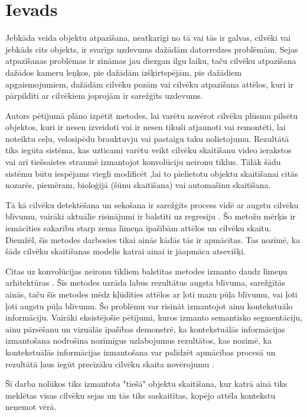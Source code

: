 \chapter{Ievads}
Jebkāda veida objektu atpazīšana, neatkarīgi no tā vai tās ir galvas, cilvēki vai jebkāds cits objekts, ir svarīgs uzdevums dažādām datorredzes problēmām. Sejas atpazīšanas problēmas ir zināmas jau diezgan ilgu laiku, taču cilvēku atpazīšana dažādos kameru leņķos, pie dažādām izšķirtspējām, pie dažādiem apgaismojumiem, dažādām cilvēku pozām vai cilvēku atpazīšana attēlos, kuri ir pārpildīti ar cilvēkiem joprojām ir sarežģīts uzdevums.

Autors pētījumā plāno izpētīt metodes, lai varētu novērot cilvēku plūsmu pilsētu objektos, kuri ir nesen izveidoti vai ir nesen tikuši atjaunoti vai remontēti, lai noteiktu ceļu, velosipēdu brauktuvju vai pastaigu taku nolietojumu. Rezultātā tiks iegūta sistēma, kas uzticami varētu veikt cilvēku skaitīšanu video ierakstos vai arī tiešsaistes straumē izmantojot konvolūciju neironu tīklus. Tālāk šādu sistēmu būtu iespējams viegli modificēt ,lai to pielietotu objektu skaitīšanai citās nozarēs, piemēram, bioloģijā (šūnu skaitīšana) vai automašīnu skaitīšana.

Tā kā cilvēku detektēšana un sekošana ir sarežģīts process vidē ar augstu cilvēku blīvumu, vairāki aktuālie risinājumi ir balstīti uz regresiju \cite{chen2012feature,chen2013cumulative}. Šo metožu mērķis ir iemācīties sakarību starp zema līmeņa īpašībām attēlos un cilvēku skaitu. Diemžēl, šīs metodes darbosies tikai ainās kādās tās ir apmācītas. Tas nozīmē, ka šāds cilvēku skaitīšanas modelis katrai ainai ir jāapmāca atsevišķi.

Citas uz konvolūcijas neironu tīkliem balstītas metodes izmanto daudz līmeņu arhitektūras \cite{zhang2016single,onoro2016towards}. Šīs metodes uzrāda labus rezultātus augsta blīvuma, sarežģītās ainās, taču šīs metodes mēdz kļūdīties attēlos ar ļoti mazu pūļa blīvumu, vai ļoti ļoti augstu pūļa blīvumu. Šo problēmu var risināt izmantojot ainu kontekstuālo informāciju. Vairāki eksistējošie pētījumi, kuros izmanto semantisko segmentāciju, ainu pārsēšanu un vizuālās īpašības demonstrē, ka kontekstuālās informācijas izmantošana nodrošina nozīmīgus uzlabojumus rezultātos, kas nozīmē, ka kontekstuālās informācijas izmantošana var palīdzēt apmācības procesā un rezultātā ļaus iegūt precīzāku cilvēku skaita novērojumu \cite{sindagi2017generating}. 

Šī darba nolūkos tiks izmantota "tiešā" objektu skaitīšana, kur katrā ainā tiks meklētas visas cilvēku sejas un tās tiks saskaitītas, kopējo attēla kontekstu neņemot vērā.

